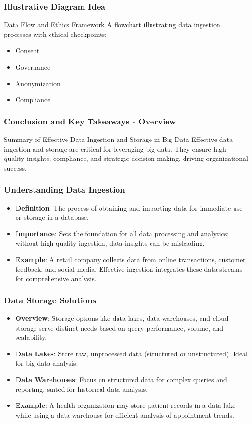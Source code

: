 \documentclass[aspectratio=169]{beamer}
\begin{document}
\begin{frame}[fragile]
    \frametitle{Illustrative Diagram Idea}
    \begin{block}{Data Flow and Ethics Framework}
        A flowchart illustrating data ingestion processes with ethical checkpoints:
        \begin{itemize}
            \item Consent
            \item Governance
            \item Anonymization
            \item Compliance
        \end{itemize}
    \end{block}
\end{frame}

\begin{frame}[fragile]
  \frametitle{Conclusion and Key Takeaways - Overview}
  \begin{block}{Summary of Effective Data Ingestion and Storage in Big Data}
      Effective data ingestion and storage are critical for leveraging big data. They ensure high-quality insights, compliance, and strategic decision-making, driving organizational success.
  \end{block}
\end{frame}

\begin{frame}[fragile]
  \frametitle{Understanding Data Ingestion}
  \begin{itemize}
      \item \textbf{Definition}: The process of obtaining and importing data for immediate use or storage in a database.
      \item \textbf{Importance}: Sets the foundation for all data processing and analytics; without high-quality ingestion, data insights can be misleading.
      \item \textbf{Example}: A retail company collects data from online transactions, customer feedback, and social media. Effective ingestion integrates these data streams for comprehensive analysis.
  \end{itemize}
\end{frame}

\begin{frame}[fragile]
  \frametitle{Data Storage Solutions}
  \begin{itemize}
      \item \textbf{Overview}: Storage options like data lakes, data warehouses, and cloud storage serve distinct needs based on query performance, volume, and scalability.
      \item \textbf{Data Lakes}: Store raw, unprocessed data (structured or unstructured). Ideal for big data analysis.
      \item \textbf{Data Warehouses}: Focus on structured data for complex queries and reporting, suited for historical data analysis.
      \item \textbf{Example}: A health organization may store patient records in a data lake while using a data warehouse for efficient analysis of appointment trends.
  \end{itemize}
\end{frame}
\end{document}
